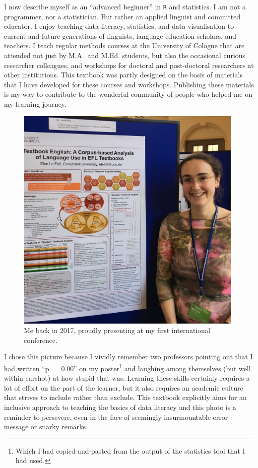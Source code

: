 \documentclass[
  letterpaper,
  DIV=11,
  numbers=noendperiod]{scrreprt}
\begin{document}
I now describe myself as an ``advanced beginner'' in \texttt{R} and
statistics. I am not a programmer, nor a statistician. But rather an
applied linguist and committed educator. I enjoy teaching data literacy,
statistics, and data visualisation to current and future generations of
linguists, language education scholars, and teachers. I teach regular
methods courses at the University of Cologne that are attended not just
by M.A.~and M.Ed. students, but also the occasional curious researcher
colleagues, and workshops for doctoral and post-doctoral researchers at
other institutions. This textbook was partly designed on the basis of
materials that I have developed for these courses and workshops.
Publishing these materials is my way to contribute to the wonderful
community of people who helped me on my learning journey.

\begin{figure}[H]

{\centering \includegraphics[width=4.35417in,height=\textheight]{images/CL2017_6.jpeg}

}

\caption{Me back in 2017, proudly presenting at my first international
conference.}

\end{figure}%

I chose this picture because I vividly remember two professors pointing
out that I had written ``p~=~0.00'' on my poster\footnote{Which I had
  copied-and-pasted from the output of the statistics tool that I had
  used.} and laughing among themselves (but well within earshot) at how
stupid that was. Learning these skills certainly requires a lot of
effort on the part of the learner, but it also requires an academic
culture that strives to include rather than exclude. This textbook
explicitly aims for an inclusive approach to teaching the basics of data
literacy and this photo is a reminder to persevere, even in the face of
seemingly insurmountable error message or snarky remarks.
\end{document}
